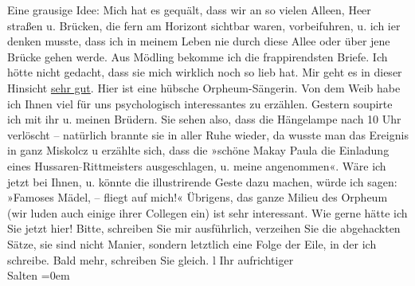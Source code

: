\begin{ledgroupsized}[t]{13cm}
           Eine grausige Idee: Mich hat es gequält, dass wir an so vielen Alleen, Heer straßen
               u. Brücken,  die fern am Horizont sichtbar waren,
               vorbeifuhren, u. ich i{\geminationm}er denken musste, dass ich in
               meinem Leben nie durch diese Allee oder über jene Brücke gehen werde. \pend
           \pstart
           {\pb}Aus Mödling bekomme ich die frappirendsten
               Briefe. Ich hötte nicht gedacht, dass sie mich wirklich
               noch so lieb hat. Mir geht es in dieser Hinsicht \uline{sehr
                  gut}.\pend
           \pstart
           Hier ist eine hübsche Orpheum-Sängerin. Von dem Weib habe ich
               Ihnen viel für uns psychologisch interessantes zu erzählen.\pend
           \pstart
           Gestern soupirte ich mit ihr u. meinen Brüdern. Sie sehen also, dass die Hängelampe nach 10 Uhr verlöscht –
               natürlich brannte sie in aller Ruhe wieder, {\pb}da wusste man das Ereignis
               in ganz Miskolcz u erzählte sich, dass die
               »schöne Makay Paula die Einladung eines
                  Hussaren\textcolor{gray}{-}Rittmeisters ausgeschlagen, u. meine angenommen«. \pend
           \pstart
           Wäre ich jetzt bei Ihnen, u. könnte die illustrirende Geste dazu machen, würde ich
               sagen: »Famoses Mädel, – fliegt \label{K_L03103-1v}\label{K_L03103-1h} auf mich!«\pend
           \pstart
           Übrigens, das ganze Milieu des Orpheum (wir luden
               auch einige ihrer Collegen ein) ist sehr interessant.\pend
           \pstart
           Wie gerne hätte ich Sie jetzt hier!\pend
           \pstart
           Bitte, schreiben Sie mir ausführlich, verzeihen Sie die abgehackten Sätze, sie sind
               nicht Manier, sondern letztlich eine Folge der Eile, in der ich schreibe.\pend
           \pstart
           Bald mehr, schreiben Sie gleich. l \pend
           \pstart
           Ihr aufrichtiger{\\[\baselineskip]}\spacefill\mbox{Salten}\pend
           \leftskip=0em{}
         

\end{ledgroupsized}
